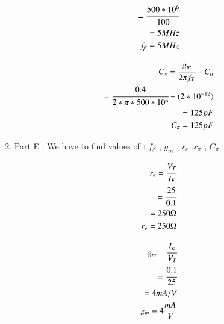 \begin{enumerate}[label=\thesubsection.\arabic*.,ref=\thesubsection.\theenumi]
\begin{align}
                  = \cfrac{500*{10^6}}{100}\\
                  
                  = 5 MHz\\
        
        f_{\beta} = 5 MHz

\end{align}
 
\begin{align}

         C_{\pi} = \cfrac{g_{m}}{2\pi f_{T}}- C_{\mu}\\
                 
                 =\cfrac{0.4}{2*\pi*500*{10^6}}- (2*{10^{-12}})\\
              
                 = 125 pF\\
              
         C_{\pi} = 125 pF 

\end{align} 
    


\item
Part E : We have to find values of :
 $f_{\beta}$ , $g_{m}$ , $r_{e}$ ,$r_{\pi}$ , $C_{\pi}$ \\
  
\solution

\begin{align}

        r_{e} = \cfrac{V_{T}}{I_{E}}\\
              
              = \cfrac{25}{0.1}\\
              
              = 250 \ohm \\
              
        r_{e} = 250 \ohm
        
\end{align}

\begin{align}
    
        g_{m} = \cfrac{I_{E}}{V_{T}}\\
              
              = \cfrac{0.1}{25}\\
              
              =  4 mA/V\\
        
        g_{m}=  4 \frac{mA}{V}


\end{align}
\end{enumerate}
